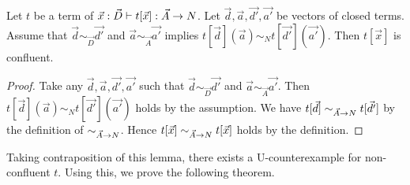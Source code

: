 
\begin{lemma}\label{lem:uniq_value}
  Let $t$ be a term of $\vec{x}:\vec{D} \vdash t[\vec{x}]:\vec{A}\rightarrow{N}$. 
  Let $\vec{d},\vec{a},\vec{d'},\vec{a'}$ be vectors of closed terms.
  Assume that
  $\vec{d}\sim_{\vec{D}}\vec{d'}$ and $\vec{a}\sim_{\vec{A}}\vec{a'}$ implies $t[\vec{d}](\vec{a}) \sim_N t[\vec{d'}](\vec{a'})$. 
  Then $t[\vec{x}]$ is confluent. 
\end{lemma}
\begin{proof}
  Take any $\vec{d},\vec{a},\vec{d'},\vec{a'}$ such that $\vec{d}\sim_{\vec{D}}\vec{d'}$ and $\vec{a}\sim_{\vec{A}}\vec{a'}$.
  Then $t[\vec{d}](\vec{a}) \sim_N t[\vec{d'}](\vec{a'})$ holds by the assumption.
  We have $t[\vec{d}] \sim_{\vec{A}\rightarrow{N}} t[\vec{d'}]$ by the definition of $\sim_{\vec{A}\rightarrow{N}}$.
  Hence $t[\vec{x}] \sim_{\vec{A}\rightarrow{N}} t[\vec{x}]$ holds by the definition. 
\end{proof}

Taking contraposition of this lemma, there exists a U-counterexample for non-confluent $t$. 
Using this, we prove the following theorem.

